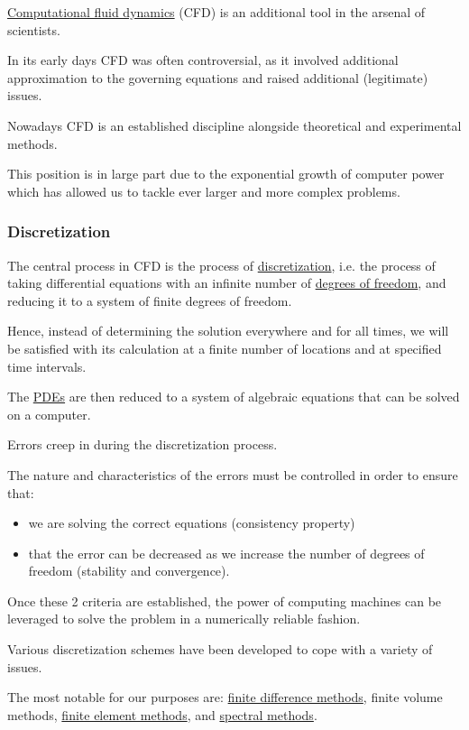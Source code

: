 \documentclass{article}
\begin{document}
\href{https://en.wikipedia.org/wiki/Computational_fluid_dynamics}{Computational fluid dynamics} (CFD) is an additional tool in the arsenal of scientists.

In its early days CFD was often controversial, as it involved additional approximation to the governing equations and raised additional (legitimate) issues.

Nowadays CFD is an established discipline alongside theoretical and experimental methods.

This position is in large part due to the exponential growth of computer power which has allowed us to tackle ever larger and more complex problems.

\subsubsection{Discretization}
The central process in CFD is the process of \href{https://en.wikipedia.org/wiki/Discretization}{discretization}, i.e. the process of taking differential equations with an infinite number of \href{https://en.wikipedia.org/wiki/Degrees_of_freedom}{degrees of freedom}, and reducing it to a system of finite degrees of freedom.

Hence, instead of determining the solution everywhere and for all times, we will be satisfied with its calculation at a finite number of locations and at specified time intervals.

The \href{https://en.wikipedia.org/wiki/Partial_differential_equations}{PDEs} are then reduced to a system of algebraic equations that can be solved on a computer.

Errors creep in during the discretization process.

The nature and characteristics of the errors must be controlled in order to ensure that:
\begin{itemize}
	\item we are solving the correct equations (consistency property)
	\item that the error can be decreased as we increase the number of degrees of freedom (stability and convergence).
\end{itemize}
Once these 2 criteria are established, the power of computing machines can be leveraged to solve the problem in a numerically reliable fashion.

Various discretization schemes have been developed to cope with a variety of issues.

The most notable for our purposes are: \href{https://en.wikipedia.org/wiki/Finite_difference_methods}{finite difference methods}, finite volume methods, \href{https://en.wikipedia.org/wiki/Finite_element_methods}{finite element methods}, and \href{https://en.wikipedia.org/wiki/Spectral_methods}{spectral methods}.
\end{document}

